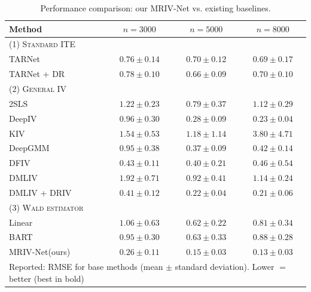 \documentclass[nonatbib]{article}
\newcommand{\modelname}{\mbox{MRIV-Net}\xspace}
\theoremstyle{definition}
\theoremstyle{plain}
\begin{document}
\begin{table}[tbp]
\caption{Performance comparison: our \modelname vs. existing baselines.}
\label{tab:base}
\centering
\vspace{-0.3cm}
\label{t:results_sim}
\scriptsize
\begin{tabular}{lccc}
\toprule
{Method} & {$n = 3000$} & {$n = 5000$} & {$n = 8000$} \\
\midrule
\textsc{(1) Standard ITE} & &  & \\
\quad TARNet \cite{Shalit.2017} &$0.76 \pm 0.14$& $0.70 \pm 0.12$ & $0.69 \pm 0.17$\\
\quad TARNet + DR \cite{Shalit.2017, Kennedy.2020} &$0.78 \pm 0.10$& $0.66 \pm 0.09$ & $0.70 \pm 0.10$\\
\midrule
\textsc{(2) General IV} & &  & \\
\quad 2SLS \cite{Wooldridge.2013}&$1.22 \pm 0.23$ &$0.79 \pm 0.37$  & $1.12 \pm 0.29$ \\
\quad DeepIV \cite{Hartford.2017}&$0.96 \pm 0.30$ & $0.28 \pm 0.09$ & $0.23 \pm 0.04$\\
\quad KIV \cite{Singh.2019}&$1.54 \pm 0.53$ & $1.18 \pm 1.14$ &  $3.80 \pm 4.71$\\
\quad DeepGMM \cite{Bennett.2019}&$0.95 \pm 0.38$ &$0.37 \pm 0.09$  & $0.42 \pm 0.14$ \\
\quad DFIV \cite{Xu.2021}&$0.43 \pm 0.11$ & $0.40 \pm 0.21$ & $0.46 \pm 0.54$ \\
\quad DMLIV \cite{Syrgkanis.2019}&$1.92 \pm 0.71$ & $0.92 \pm 0.41$ &  $1.14 \pm 0.24$\\
\quad DMLIV + DRIV \cite{Syrgkanis.2019}&$0.41 \pm 0.12$ & $0.22 \pm 0.04$ &  $0.21 \pm 0.06$\\
\midrule
\textsc{(3) Wald estimator \cite{Wald.1940}} & &  & \\
\quad Linear &$1.06 \pm 0.63$ & $0.62 \pm 0.22$ &  $0.81 \pm 0.34$\\
\quad BART &$0.95 \pm 0.30$ &$0.63 \pm 0.33$ &$0.88 \pm 0.28$\\ \bottomrule \noalign{\smallskip}
\modelname (ours) &$\boldsymbol{0.26 \pm 0.11}$ & $\boldsymbol{0.15 \pm 0.03}$ & $\boldsymbol{0.13 \pm 0.03}$\\

\bottomrule
\multicolumn{4}{l}{Reported: RMSE for base methods (mean $\pm$ standard deviation). Lower $=$ better (best in bold)}
\end{tabular}
\vspace{-0.3cm}
\end{table}
\end{document}

